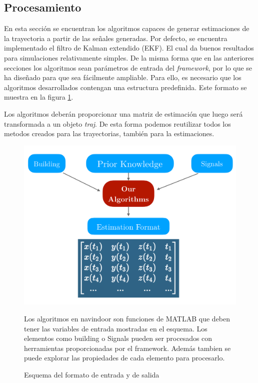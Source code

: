 


\subsection{Procesamiento}

En esta sección se encuentran los algoritmos capaces de generar estimaciones de la trayectoria a partir de las señales generadas. Por defecto, se encuentra implementado el filtro de Kalman extendido (EKF)\cite{Mycielski1992}. El cual da buenos resultados para simulaciones relativamente simples. De la misma forma que en las anteriores secciones los algoritmos sean parámetros de entrada del \emph{framework}, por lo que se ha diseñado para que sea fácilmente ampliable. Para ello, es necesario que los algoritmos desarrollados contengan una estructura predefinida. Este formato se muestra en la figura \ref{schemaPro}.

Los algoritmos deberán proporcionar una matriz de estimación que luego será transformada a un objeto \emph{traj}. De esta forma podemos reutilizar todos los metodos creados para las trayectorias, también para la estimaciones. 

\begin{figure}
    \centering
    \includegraphics[width=0.8\columnwidth]{img/Design/5.pdf}
    \caption[]{Esquema del formato de entrada y de salida}
    \footnotesize 
    Los algoritmos en navindoor son funciones de MATLAB que deben tener las variables de entrada mostradas en el esquema. Los elementos como building o Signals pueden ser procesados con herramientas proporcionadas por el framework. Además tambien se puede explorar las propiedades de cada elemento para procesarlo.
    \label{schemaPro}
\end{figure}

